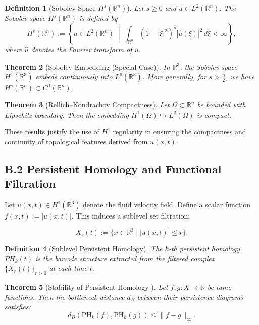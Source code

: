 \documentclass[11pt]{article}
\newtheorem{theorem}{Theorem}[section]
\newtheorem{definition}[theorem]{Definition}
\begin{document}
\begin{definition}[Sobolev Space $H^s(\mathbb{R}^n)$]
Let $s \geq 0$ and $u \in L^2(\mathbb{R}^n)$. The Sobolev space $H^s(\mathbb{R}^n)$ is defined by
\[
H^s(\mathbb{R}^n) := \left\{ u \in L^2(\mathbb{R}^n) \;\middle|\; \int_{\mathbb{R}^n} (1 + |\xi|^2)^s |\widehat{u}(\xi)|^2 \, d\xi < \infty \right\},
\]
where $\widehat{u}$ denotes the Fourier transform of $u$.
\end{definition}

\begin{theorem}[Sobolev Embedding (Special Case)]
In $\mathbb{R}^3$, the Sobolev space $H^1(\mathbb{R}^3)$ embeds continuously into $L^6(\mathbb{R}^3)$.  
More generally, for $s > \frac{n}{2}$, we have $H^s(\mathbb{R}^n) \subset C^0(\mathbb{R}^n)$.
\end{theorem}

\begin{theorem}[Rellich–Kondrachov Compactness]
Let $\Omega \subset \mathbb{R}^n$ be bounded with Lipschitz boundary. Then the embedding $H^1(\Omega) \hookrightarrow L^2(\Omega)$ is compact.
\end{theorem}

These results justify the use of $H^1$ regularity in ensuring the compactness and continuity of topological features derived from $u(x,t)$.



\subsection*{B.2 Persistent Homology and Functional Filtration}

Let $u(x,t) \in H^1(\mathbb{R}^3)$ denote the fluid velocity field. Define a scalar function $f(x,t) := |u(x,t)|$. This induces a sublevel set filtration:

\[
X_r(t) := \{ x \in \mathbb{R}^3 \mid |u(x,t)| \leq r \}.
\]

\begin{definition}[Sublevel Persistent Homology]
The $k$-th persistent homology $PH_k(t)$ is the barcode structure extracted from the filtered complex $\{ X_r(t) \}_{r > 0}$ at each time $t$.
\end{definition}

\begin{theorem}[Stability of Persistent Homology {\cite{CohenSteiner2007}}]
Let $f, g: X \to \mathbb{R}$ be tame functions. Then the bottleneck distance $d_B$ between their persistence diagrams satisfies:
\[
d_B(\mathrm{PH}_k(f), \mathrm{PH}_k(g)) \leq \|f - g\|_\infty.
\]
\end{theorem}
\end{document}
